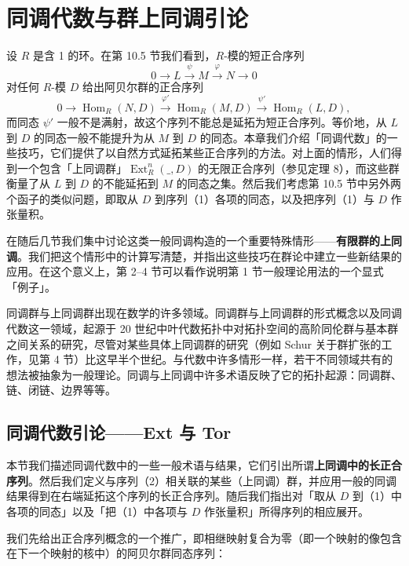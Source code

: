 
\setcounter{chapter}{16}

\chapter{同调代数与群上同调引论}

设 \(R\) 是含 1 的环。在第 10.5 节我们看到，\(R\)-模的短正合序列
\[
0 \longrightarrow L \xrightarrow{\psi} M \xrightarrow{\varphi} N \longrightarrow 0 \tag{17.1}
\]
对任何 \(R\)-模 \(D\) 给出阿贝尔群的正合序列
\[
0 \longrightarrow \operatorname{Hom}_R(N, D) \xrightarrow{\varphi'} \operatorname{Hom}_R(M, D) \xrightarrow{\psi'} \operatorname{Hom}_R(L, D), \tag{17.2}
\]
而同态 \(\psi'\) 一般不是满射，故这个序列不能总是延拓为短正合序列。等价地，从 \(L\) 到 \(D\) 的同态一般不能提升为从 \(M\) 到 \(D\) 的同态。本章我们介绍「同调代数」的一些技巧，它们提供了以自然方式延拓某些正合序列的方法。对上面的情形，人们得到一个包含「上同调群」\(\operatorname{Ext}_R^n(\_, D)\) 的无限正合序列（参见定理 8），而这些群衡量了从 \(L\) 到 \(D\) 的不能延拓到 \(M\) 的同态之集。然后我们考虑第 10.5 节中另外两个函子的类似问题，即取从 \(D\) 到序列（1）各项的同态，以及把序列（1）与 \(D\) 作张量积。

在随后几节我们集中讨论这类一般同调构造的一个重要特殊情形——\textbf{有限群的上同调}。我们把这个情形中的计算写清楚，并指出这些技巧在群论中建立一些新结果的应用。在这个意义上，第 2--4 节可以看作说明第 1 节一般理论用法的一个显式「例子」。

同调群与上同调群出现在数学的许多领域。同调群与上同调群的形式概念以及同调代数这一领域，起源于 20 世纪中叶代数拓扑中对拓扑空间的高阶同伦群与基本群之间关系的研究，尽管对某些具体上同调群的研究（例如 Schur 关于群扩张的工作，见第 4 节）比这早半个世纪。与代数中许多情形一样，若干不同领域共有的想法被抽象为一般理论。同调与上同调中许多术语反映了它的拓扑起源：同调群、链、闭链、边界等等。

\section{同调代数引论——Ext 与 Tor}

本节我们描述同调代数中的一些一般术语与结果，它们引出所谓\textbf{上同调中的长正合序列}。然后我们定义与序列（2）相关联的某些（上同调）群，并应用一般的同调结果得到在右端延拓这个序列的长正合序列。随后我们指出对「取从 \(D\) 到（1）中各项的同态」以及「把（1）中各项与 \(D\) 作张量积」所得序列的相应展开。

我们先给出正合序列概念的一个推广，即相继映射复合为零（即一个映射的像包含在下一个映射的核中）的阿贝尔群同态序列：

